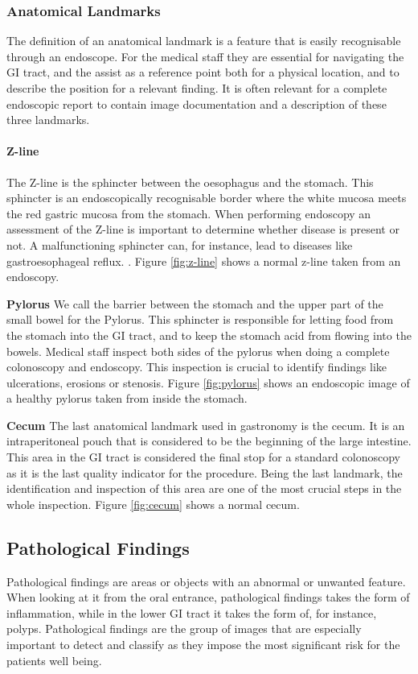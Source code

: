 \subsubsection{Anatomical Landmarks}
The definition of an anatomical landmark is a feature that is easily recognisable through an endoscope. For the medical staff they are essential for navigating the GI tract, and the assist as a reference point both for a physical location, and to describe the position for a relevant finding.
It is often relevant for a complete endoscopic report to contain image documentation and a description of these three landmarks.
 
\paragraph{Z-line}
The Z-line is the sphincter between the oesophagus and the stomach. This sphincter is an endoscopically recognisable border where the white mucosa meets the red gastric mucosa from the stomach.  When performing endoscopy an assessment of the Z-line is important to determine whether disease is present or not. A malfunctioning sphincter can, for instance, lead to diseases like gastroesophageal reflux. .
Figure \ref{fig:z-line} shows a normal z-line taken from an endoscopy. 

\textbf{Pylorus}
We call the barrier between the stomach and the upper part of the small bowel for the Pylorus. This sphincter is responsible for letting food from the stomach into the GI tract, and to keep the stomach acid from flowing into the bowels.
Medical staff inspect both sides of the pylorus when doing a complete colonoscopy and endoscopy. This inspection is crucial to identify findings like ulcerations, erosions or stenosis.  
Figure \ref{fig:pylorus} shows an endoscopic image of a healthy pylorus taken from inside the stomach.

\textbf{Cecum}
The last anatomical landmark used in gastronomy is the cecum. It is an intraperitoneal pouch that is considered to be the beginning of the large intestine. This area in the GI tract is considered the final stop for a standard colonoscopy as it is the last quality indicator for the procedure.
Being the last landmark, the identification and inspection of this area are one of the most crucial steps in the whole inspection. 
Figure \ref{fig:cecum} shows a normal cecum.


\subsection{Pathological Findings}
Pathological findings are areas or objects with an abnormal or unwanted feature. When looking at it from the oral entrance, pathological findings takes the form of inflammation, while in the lower GI tract it takes the form of, for instance, polyps. 
Pathological findings are the group of images that are especially important to detect and classify as they impose the most significant risk for the patients well being. 


